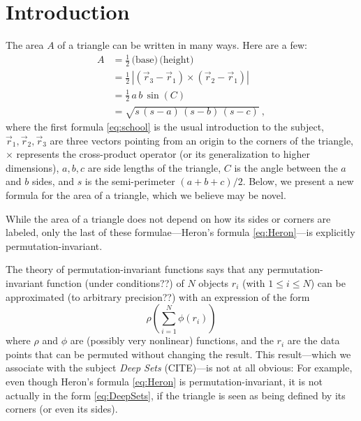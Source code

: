 \documentclass[12pt]{article}
\begin{document}
\section{Introduction}
The area $A$ of a triangle can be written in many ways.
Here are a few:
\begin{align}
A &= \frac{1}{2}\,\text{(base)}\,\text{(height)} \label{eq:school} \\
  &= \frac{1}{2}\,|(\vec{r}_3 - \vec{r}_1) \times (\vec{r}_2 - \vec{r}_1)| \label{eq:cross} \\
  &= \frac{1}{2}\,a\,b\,\sin(C) \label{eq:sine} \\
  &= \sqrt{s\,(s-a)\,(s-b)\,(s-c)} \label{eq:Heron} ~,
\end{align}
where the first formula \eqref{eq:school} is the usual introduction to the subject,
$\vec{r}_1, \vec{r}_2, \vec{r}_3$ are three vectors pointing from an origin to the corners of the triangle,
$\times$ represents the cross-product operator (or its generalization to higher dimensions),
$a, b, c$ are side lengths of the triangle,
$C$ is the angle between the $a$ and $b$ sides,
and $s$ is the semi-perimeter $(a + b + c)/2$.
Below, we present a new formula for the area of a triangle, which we believe may be novel.

While the area of a triangle does not depend on how its sides or corners are labeled,
only the last of these formulae---Heron's formula \eqref{eq:Heron}---is explicitly permutation-invariant.

The theory of permutation-invariant functions says that any per\-mu\-tation-invariant function (under conditions??) of $N$ objects $r_i$ (with $1\leq i\leq N$) can be approximated (to arbitrary precision??) with an expression of the form \citep{zaheer+17-Deep-Sets}
\begin{equation}
    \rho(\sum_{i=1}^N\phi(r_i)) \label{eq:DeepSets}
\end{equation}
where $\rho$ and $\phi$ are (possibly very nonlinear) functions,
and the $r_i$ are the data points that can be permuted without changing the result.
This result---which we associate with the subject \emph{Deep Sets} (CITE)---is not at all obvious:
For example, even though Heron's formula \eqref{eq:Heron} is permutation-invariant, it is not actually in the form \eqref{eq:DeepSets}, if the triangle is seen as being defined by its corners (or even its sides).
\end{document}

